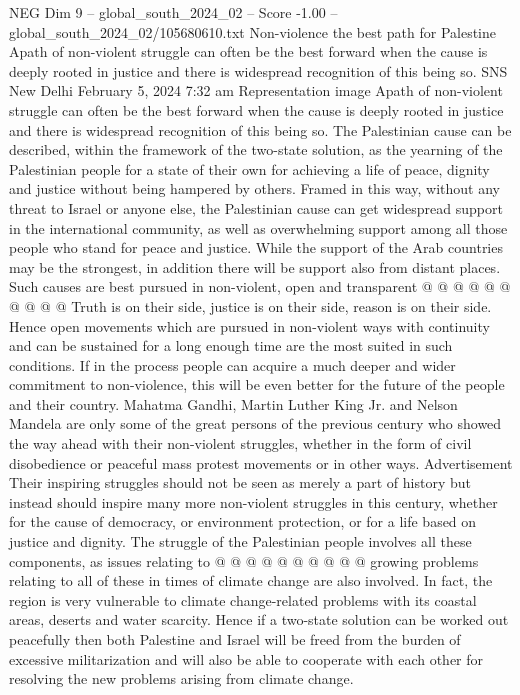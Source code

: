 \begin{textsample}{NEG Dim 9 – global\_south\_2024\_02 – Score -1.00 – global\_south\_2024\_02/105680610.txt}  \label{ex:f9_neg_365}
Non-violence the best path for Palestine Apath of non-violent struggle can often be the best forward when the cause is deeply rooted in justice and there is widespread recognition of this being so.
SNS New Delhi February 5, 2024 7:32 am Representation image Apath of non-violent struggle can often be the best forward when the cause is deeply rooted in justice and there is widespread recognition of this being so.
The Palestinian cause can be described, within the framework of the two-state solution, as the yearning of the Palestinian people for a state of their own for achieving a life of peace, dignity and justice without being hampered by others.
Framed in this way, without any threat to Israel or anyone else, the Palestinian cause can get widespread support in the international community, as well as overwhelming support among all those people who stand for peace and justice.
While the support of the Arab countries may be the strongest, in addition there will be support also from distant places.
Such causes are best pursued in non-violent, open and transparent @ @ @ @ @ @ @ @ @ @ Truth is on their side, justice is on their side, reason is on their side.
Hence open movements which are pursued in non-violent ways with continuity and can be sustained for a long enough time are the most suited in such conditions.
If in the process people can acquire a much deeper and wider commitment to non-violence, this will be even better for the future of the people and their country.
Mahatma Gandhi, Martin Luther King Jr. and Nelson Mandela are only some of the great persons of the previous century who showed the way ahead with their non-violent struggles, whether in the form of civil disobedience or peaceful mass protest movements or in other ways.
Advertisement Their inspiring struggles should not be seen as merely a part of history but instead should inspire many more non-violent struggles in this century, whether for the cause of democracy, or environment protection, or for a life based on justice and dignity.
The struggle of the Palestinian people involves all these components, as issues relating to @ @ @ @ @ @ @ @ @ @ growing problems relating to all of these in times of climate change are also involved.
In fact, the region is very vulnerable to climate change-related problems with its coastal areas, deserts and water scarcity.
Hence if a two-state solution can be worked out peacefully then both Palestine and Israel will be freed from the burden of excessive militarization and will also be able to cooperate with each other for resolving the new problems arising from climate change.

\end{textsample}
